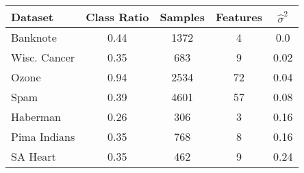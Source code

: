\begin{tabular}{lcccc}
\toprule
Dataset & Class Ratio & Samples & Features & \(\hat{\sigma}^2\) \\
\midrule
Banknote & 0.44 & 1372 & 4 & 0.0 \\
Wisc. Cancer & 0.35 & 683 & 9 & 0.02 \\
Ozone & 0.94 & 2534 & 72 & 0.04 \\
Spam & 0.39 & 4601 & 57 & 0.08 \\
Haberman & 0.26 & 306 & 3 & 0.16 \\
Pima Indians & 0.35 & 768 & 8 & 0.16 \\
SA Heart & 0.35 & 462 & 9 & 0.24 \\
\bottomrule
\end{tabular}